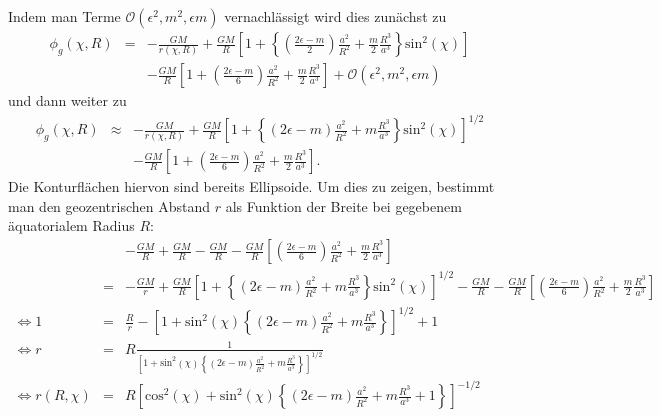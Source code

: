 \documentclass{book}
\renewcommand{\sin}{\text{sin}}
\renewcommand{\cos}{\text{cos}}
\begin{document}
%
Indem man Terme $\mathcal{O}\left(\epsilon^2, m^2, \epsilon m\right)$ vernachlässigt wird dies zunächst zu
%
\begin{eqnarray}
\phi_g\left(\chi, R\right) & = & -\frac{GM}{r\left(\chi, R\right)} + \frac{GM}{R}\left[1 + \left\{\left(\frac{2\epsilon - m}{2}\right)\frac{a^2}{R^2} + \frac{m}{2}\frac{R^3}{a^3}\right\}\sin^2\left(\chi\right)\right]\nonumber\\
&&- \frac{GM}{R}\left[1 + \left(\frac{2\epsilon - m}{6}\right)\frac{a^2}{R^2} + \frac{m}{2}\frac{R^3}{a^3}\right] + \mathcal{O}\left(\epsilon^2, m^2, \epsilon m\right)
\end{eqnarray}
%
und dann weiter zu
%
\begin{eqnarray}
\phi_g\left(\chi, R\right)&\approx& -\frac{GM}{r\left(\chi, R\right)} + \frac{GM}{R}\left[1 + \left\{\left(2\epsilon - m\right)\frac{a^2}{R^2} + m\frac{R^3}{a^3}\right\}\sin^2\left(\chi\right)\right]^{1/2}\nonumber\\
&&- \frac{GM}{R}\left[1 + \left(\frac{2\epsilon - m}{6}\right)\frac{a^2}{R^2} + \frac{m}{2}\frac{R^3}{a^3}\right].
\end{eqnarray}
%
Die Konturflächen hiervon sind bereits Ellipsoide. Um dies zu zeigen, bestimmt man den geozentrischen Abstand $r$ als Funktion der Breite bei gegebenem äquatorialem Radius $R$:
%
\begin{eqnarray}
&& -\frac{GM}{R} + \frac{GM}{R} - \frac{GM}{R} - \frac{GM}{R}\left[\left(\frac{2\epsilon - m}{6}\right)\frac{a^2}{R^2} + \frac{m}{2}\frac{R^3}{a^3}\right]\nonumber\\
& = & -\frac{GM}{r} + \frac{GM}{R}\left[1 + \left\{\left(2\epsilon - m\right)\frac{a^2}{R^2} + m\frac{R^3}{a^3}\right\}\sin^2\left(\chi\right)\right]^{1/2} - \frac{GM}{R} - \frac{GM}{R}\left[\left(\frac{2\epsilon - m}{6}\right)\frac{a^2}{R^2} + \frac{m}{2}\frac{R^3}{a^3}\right]\nonumber\\
\Leftrightarrow
1 & = & \frac{R}{r} - \left[1 + \sin^2\left(\chi\right)\left\{\left(2\epsilon - m\right)\frac{a^2}{R^2} + m\frac{R^3}{a^3}\right\}\right]^{1/2} + 1\nonumber\\
\Leftrightarrow r & = & R\frac{1}{\left[1 + \sin^2\left(\chi\right)\left\{\left(2\epsilon - m\right)\frac{a^2}{R^2} + m\frac{R^3}{a^3}\right\}\right]^{1/2}}\nonumber\\
\Leftrightarrow r\left(R, \chi\right) & = & R\left[\cos^2\left(\chi\right) + \sin^2\left(\chi\right)\left\{\left(2\epsilon - m\right)\frac{a^2}{R^2} + m\frac{R^3}{a^3} + 1\right\}\right]^{-1/2}
\end{eqnarray}
\end{document}
